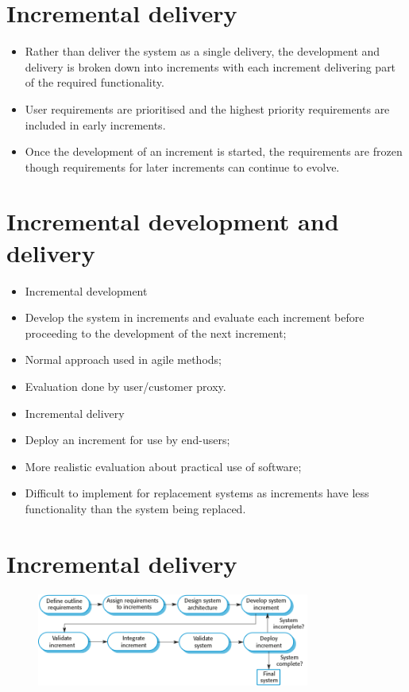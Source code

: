 \section{Incremental delivery}
\begin{itemize}
\item Rather than deliver the system as a single delivery, the development and delivery is broken down into increments with each increment delivering part of the required functionality.

\item User requirements are prioritised and the highest priority requirements are included in early increments.

\item Once the development of an increment is started, the requirements are frozen though requirements for later increments can continue to evolve.
\end{itemize}

\section{Incremental development and delivery}
\begin{itemize}
\item Incremental development
\item Develop the system in increments and evaluate each increment before proceeding to the development of the next increment;
\item Normal approach used in agile methods; \item Evaluation done by user/customer proxy.
\item Incremental delivery

\item Deploy an increment for use by end-users;

\item More realistic evaluation about practical use of software;

\item Difficult to implement for replacement systems as increments have less functionality than the system being replaced.
\end{itemize}
\section{Incremental delivery}
\begin{figure}[h!]
    \centering
    \includegraphics[width = 0.8\textwidth]{./figures/L1_10.png}
    \caption{}
    \label{fig:L1_10}
\end{figure}


